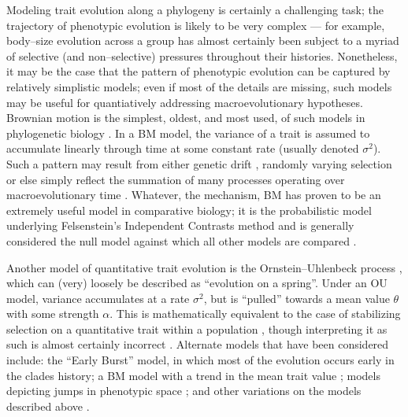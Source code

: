 \documentclass[a4paper,12pt]{article}
\begin{document}
Modeling trait evolution along a phylogeny is certainly a challenging task; the trajectory of phenotypic evolution is likely to be very complex --- for example, body--size evolution across a group has almost certainly been subject to a myriad of selective (and non--selective) pressures throughout their histories. Nonetheless, it may be the case that the pattern of phenotypic evolution can be captured by relatively simplistic models; even if most of the details are missing, such models may be useful for quantiatively addressing macroevolutionary hypotheses. Brownian motion is the simplest, oldest, and most used, of such models in phylogenetic biology  \citep[BM;][]{Edwards1964, Felsenstein1973, Thompson1975}. In a BM model, the variance of a trait is assumed to accumulate linearly through time at some constant rate (usually denoted $\sigma^2$). Such a pattern may result from either genetic drift \citep{Lande1976, HansenMartins1996}, randomly varying selection \citep{Felsenstein1973, Felsenstein1988} or else simply reflect the summation of many processes operating over macroevolutionary time \citep{HansenMartins1996, Uyeda2011, PennellHarmon, PennellPE}. Whatever, the mechanism, BM has proven to be an extremely useful model in comparative biology; it is the probabilistic model underlying Felsenstein's Independent Contrasts method \citep[][see below]{Felsenstein1985} and is generally considered the null model against which all other models are compared \citep{Blomberg2003}. %
 
Another model of quantitative trait evolution is the Ornstein--Uhlenbeck process \citep[OU;][]{Felsenstein1988, Hansen1997}, which can (very) loosely be described as ``evolution on a spring''. Under an OU model, variance accumulates at a rate $\sigma^2$, but is ``pulled'' towards a mean value $\theta$ with some strength $\alpha$. This is mathematically equivalent to the case of stabilizing selection on a quantitative trait within a population \citep{Lande1976}, though interpreting it as such is almost certainly incorrect \citep{HansenMartins2006, PennellHarmon}.  
Alternate models that have been considered include: the ``Early Burst'' \citep[EB;][]{Blomberg2003, Harmon2010, SlaterPennell} model, in which most of the evolution occurs early in the clades history; a BM model with a trend in the mean trait value \citep{Hunt2006}; models depicting jumps in phenotypic space \citep{Landis2012, Eastmanlevy}; and other variations on the models described above \citep[e.g.][]{Pagel1997, Pagel1999, ButlerKing2004, Omeara2006, Eastman2011, Beaulieu2012, SlaterMEE}. 
\end{document}
